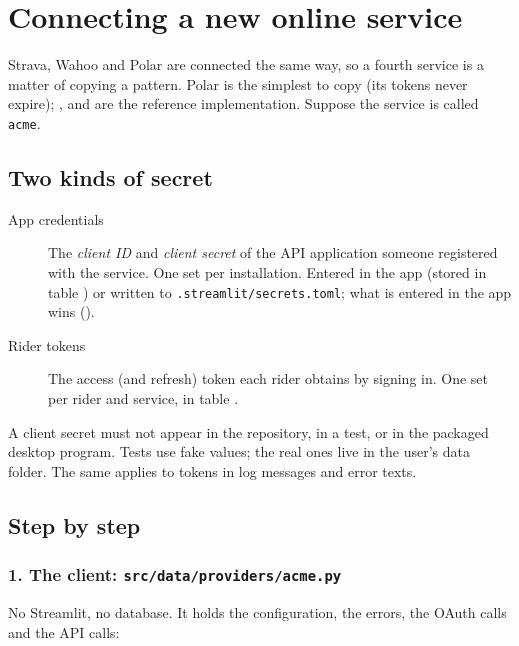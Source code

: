 \chapter{Connecting a new online service}\label{ch:providers}

Strava, Wahoo and Polar are connected the same way, so a fourth service is a matter of copying a pattern. Polar is the
simplest to copy (its tokens never expire); ,  and  are
the reference implementation. Suppose the service is called \texttt{acme}.

\section{Two kinds of secret}

\begin{description}
\item[App credentials] The \emph{client ID} and \emph{client secret} of the API application someone registered with the
  service. One set per installation. Entered in the app (stored in table ) or written to
  \texttt{.streamlit/secrets.toml}; what is entered in the app wins ().
\item[Rider tokens] The access (and refresh) token each rider obtains by signing in. One set per rider and service,
  in table .
\end{description}

\begin{warn}
A client secret must not appear in the repository, in a test, or in the packaged desktop program. Tests use fake
values; the real ones live in the user's data folder. The same applies to tokens in log messages and error texts.
\end{warn}

\section{Step by step}

\subsection*{1. The client: \texttt{src/data/providers/acme.py}}

No Streamlit, no database. It holds the configuration, the errors, the OAuth calls and the API calls:

